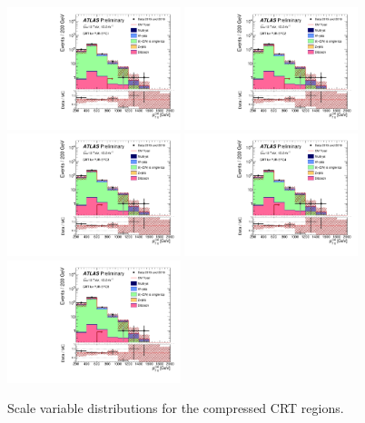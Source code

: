 \begin{figure}[tbph]
\begin{center}
\includegraphics[width=0.45\textwidth]{figures/ATLAS-CONF-2016-078_INT/N-1Plots/AtlasStyle/Preliminary/CRT_SRJigsawSRC1_LastCut_CRT_minusone}
\includegraphics[width=0.45\textwidth]{figures/ATLAS-CONF-2016-078_INT/N-1Plots/AtlasStyle/Preliminary/CRT_SRJigsawSRC2_LastCut_CRT_minusone}
\includegraphics[width=0.45\textwidth]{figures/ATLAS-CONF-2016-078_INT/N-1Plots/AtlasStyle/Preliminary/CRT_SRJigsawSRC3_LastCut_CRT_minusone}
\includegraphics[width=0.45\textwidth]{figures/ATLAS-CONF-2016-078_INT/N-1Plots/AtlasStyle/Preliminary/CRT_SRJigsawSRC4_LastCut_CRT_minusone}
\includegraphics[width=0.45\textwidth]{figures/ATLAS-CONF-2016-078_INT/N-1Plots/AtlasStyle/Preliminary/CRT_SRJigsawSRC5_LastCut_CRT_minusone}
\end{center}
\caption{Scale variable distributions for the compressed CRT regions.}
\label{fig:CRT_SRJigsawSRC1_LastCut_CRT_minusone}
\end{figure}

